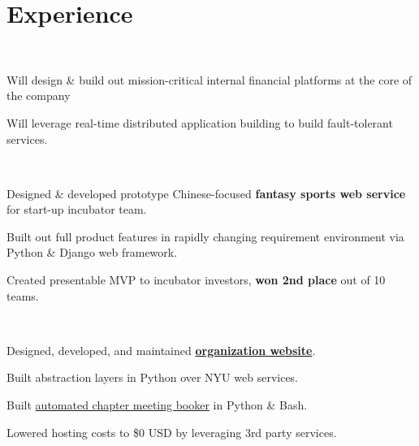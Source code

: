 \documentclass[]{hieudo-build}
\begin{document}
\begin{minipage}[t]{0.65\textwidth} 

\section{Experience}

 \\
 \vspace{\topsep} %
\begin{tightemize}
\item Will design \& build out mission-critical internal financial platforms at the core of the company
\item Will leverage real-time distributed application building to build fault-tolerant services.
\end{tightemize}
\sectionsep

\\
\begin{tightemize}
\item Designed \& developed prototype Chinese-focused {\bf fantasy sports web service} for start-up incubator team.
\item Built out full product features in rapidly changing requirement environment via Python \& Django web framework.
\item Created presentable MVP to incubator investors, {\bf won 2nd place} out of 10 teams.
\end{tightemize}
\sectionsep

\\
\begin{tightemize}
\item Designed, developed, and maintained  {\bf \href{https://www.skullhouse.nyc}{organization website}}.
\item Built abstraction layers in Python over NYU web services.
\item Built \href{https://github.com/JasonYao/Bobst-Room-Automator}{automated chapter meeting booker} in Python \& Bash.
\item Lowered hosting costs to \$0 USD by leveraging 3rd party services.
\end{tightemize}
\sectionsep


\end{minipage}
\end{document}
